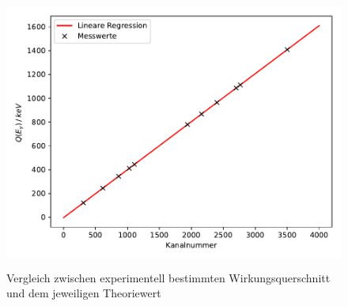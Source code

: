 \begin{figure}
  \centering
  \includegraphics[height=9cm]{Plot3.pdf}
  \caption{Vergleich zwischen experimentell bestimmten Wirkungsquerschnitt und dem jeweiligen Theoriewert}
  \label{fig:plot3}
\end{figure}


